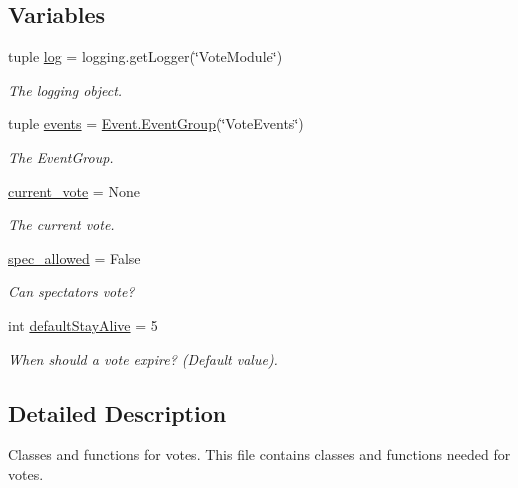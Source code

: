 \subsection*{Variables}
\begin{DoxyCompactItemize}
\item 
tuple \hyperlink{namespace_vote_a081b01b11b311cef57a1bd37c864d363}{log} = logging.getLogger(\char`\"{}VoteModule\char`\"{})
\begin{DoxyCompactList}\small\item\em The logging object. \item\end{DoxyCompactList}\item 
tuple \hyperlink{namespace_vote_a611c4a69371fcbdcc7683a654b737a14}{events} = \hyperlink{class_event_1_1_event_group}{Event.EventGroup}(\char`\"{}VoteEvents\char`\"{})
\begin{DoxyCompactList}\small\item\em The EventGroup. \item\end{DoxyCompactList}\item 
\hyperlink{namespace_vote_a6f1e35e3cde6d6b591ca9c8a2eaa5064}{current\_\-vote} = None
\begin{DoxyCompactList}\small\item\em The current vote. \item\end{DoxyCompactList}\item 
\hyperlink{namespace_vote_ae0bddda424d524ab6f934decff807faa}{spec\_\-allowed} = False
\begin{DoxyCompactList}\small\item\em Can spectators vote? \item\end{DoxyCompactList}\item 
int \hyperlink{namespace_vote_a3ed2d759405d2be1e6f53c128aef371a}{defaultStayAlive} = 5
\begin{DoxyCompactList}\small\item\em When should a vote expire? (Default value). \item\end{DoxyCompactList}\end{DoxyCompactItemize}


\subsection{Detailed Description}
Classes and functions for votes. This file contains classes and functions needed for votes. 

